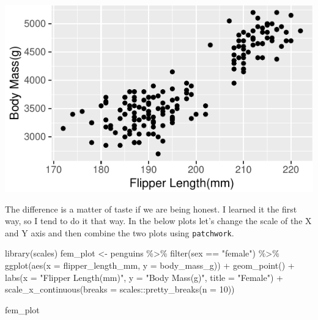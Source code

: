 \documentclass[]{tufte-handout}
\newenvironment{Shaded}{}{}
\newcommand{\AttributeTok}[1]{\textcolor[rgb]{0.49,0.56,0.16}{#1}}
\newcommand{\DecValTok}[1]{\textcolor[rgb]{0.25,0.63,0.44}{#1}}
\newcommand{\FunctionTok}[1]{\textcolor[rgb]{0.02,0.16,0.49}{#1}}
\newcommand{\NormalTok}[1]{#1}
\newcommand{\OtherTok}[1]{\textcolor[rgb]{0.00,0.44,0.13}{#1}}
\newcommand{\SpecialCharTok}[1]{\textcolor[rgb]{0.25,0.44,0.63}{#1}}
\newcommand{\StringTok}[1]{\textcolor[rgb]{0.25,0.44,0.63}{#1}}
\begin{document}
\begin{center}\includegraphics{R-Guide_files/figure-latex/female-plot-pipes-1} \end{center}

The difference is a matter of taste if we are being honest. I learned it
the first way, so I tend to do it that way. In the below plots let's
change the scale of the X and Y axis and then combine the two plots
using \texttt{patchwork}.

\begin{Shaded}
\begin{Highlighting}[]
\FunctionTok{library}\NormalTok{(scales)}
\NormalTok{fem\_plot }\OtherTok{\textless{}{-}}\NormalTok{ penguins }\SpecialCharTok{\%\textgreater{}\%}
  \FunctionTok{filter}\NormalTok{(sex }\SpecialCharTok{==} \StringTok{"female"}\NormalTok{) }\SpecialCharTok{\%\textgreater{}\%}
  \FunctionTok{ggplot}\NormalTok{(}\FunctionTok{aes}\NormalTok{(}\AttributeTok{x =}\NormalTok{ flipper\_length\_mm, }\AttributeTok{y =}\NormalTok{ body\_mass\_g)) }\SpecialCharTok{+}
  \FunctionTok{geom\_point}\NormalTok{() }\SpecialCharTok{+}
  \FunctionTok{labs}\NormalTok{(}\AttributeTok{x =} \StringTok{"Flipper Length(mm)"}\NormalTok{, }\AttributeTok{y =} \StringTok{"Body Mass(g)"}\NormalTok{, }\AttributeTok{title =} \StringTok{"Female"}\NormalTok{) }\SpecialCharTok{+}
  \FunctionTok{scale\_x\_continuous}\NormalTok{(}\AttributeTok{breaks =}\NormalTok{ scales}\SpecialCharTok{::}\FunctionTok{pretty\_breaks}\NormalTok{(}\AttributeTok{n =} \DecValTok{10}\NormalTok{))}


\NormalTok{fem\_plot}
\end{Highlighting}
\end{Shaded}
\end{document}

